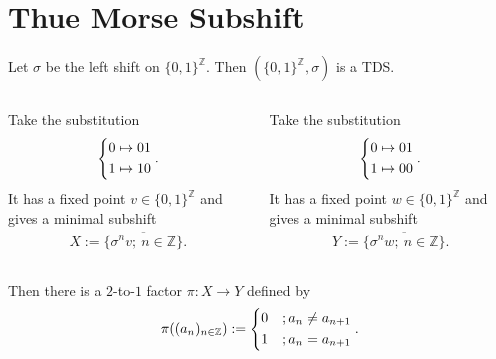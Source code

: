 \section{Thue Morse Subshift}

\begin{frame}
	Let $\sigma$ be the left shift on $\{0, 1\}^\mathbb{Z}$. Then $(\{0, 1\}^\mathbb{Z}, \sigma)$ is a TDS.\pause
	\begin{columns}
		\begin{column}{.5\textwidth}
			\begin{example}
				Take the substitution
				\begin{align*}
					\begin{dcases}
						0 \mapsto 01\\
						1 \mapsto 10
					\end{dcases}.
				\end{align*}\pause
				It has a fixed point $v \in \{0, 1\}^\mathbb{Z}$ and gives a minimal subshift
				\begin{align*}
					X := \overline{\{\sigma^nv;\ n \in \mathbb{Z}\}}.
				\end{align*}
			\end{example}\pause
		\end{column}
		\begin{column}{.5\textwidth}
			\begin{example}
				Take the substitution
				\begin{align*}
					\begin{dcases}
						0 \mapsto 01\\
						1 \mapsto 00
					\end{dcases}.
				\end{align*}\pause
				It has a fixed point $w \in \{0, 1\}^\mathbb{Z}$ and gives a minimal subshift
				\begin{align*}
					Y := \overline{\{\sigma^nw;\ n \in \mathbb{Z}\}}.
				\end{align*}
			\end{example}\pause
		\end{column}
	\end{columns}
	\medskip

	Then there is a $2$-to-$1$ factor $\pi: X \to Y$ defined by
	\begin{align*}
		\pi((a_n)_{n \in \mathbb{Z}}) :=
		\begin{dcases}
			0 &; a_n \neq a_{n+1}\\
			1 &; a_n = a_{n+1}
		\end{dcases}.
	\end{align*} 
\end{frame}

